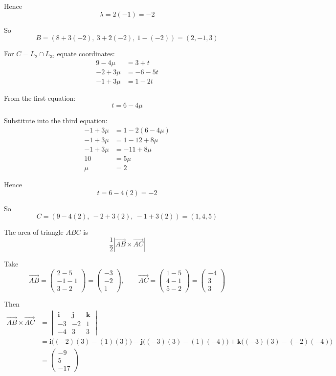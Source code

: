 \documentclass[leqno]{article}
\begin{document}
\begin{enumerate}[
  label=\textbf{\arabic*.},
  leftmargin=*,
  topsep=0pt,
  partopsep=0pt,
  parsep=0pt
]
\begin{djsSolution}
Hence
\[
\lambda=2(-1)=-2
\]

So
\[
B=(8+3(-2),\ 3+2(-2),\ 1-(-2))=(2,-1,3)
\]

For \(C=L_2\cap L_3\), equate coordinates:
\begin{align*}
9-4\mu&=3+t \\
-2+3\mu&=-6-5t \\
-1+3\mu&=1-2t
\end{align*}

From the first equation:
\[
t=6-4\mu
\]

Substitute into the third equation:
\begin{align*}
-1+3\mu&=1-2(6-4\mu) \\
-1+3\mu&=1-12+8\mu \\
-1+3\mu&=-11+8\mu \\
10&=5\mu \\
\mu&=2
\end{align*}

Hence
\[
t=6-4(2)=-2
\]

So
\[
C=(9-4(2),\ -2+3(2),\ -1+3(2))=(1,4,5)
\]

The area of triangle \(ABC\) is
\[
\frac12\left|\overrightarrow{AB}\times\overrightarrow{AC}\right|
\]

Take
\[
\overrightarrow{AB}=
\begin{pmatrix}
2-5\\
-1-1\\
3-2
\end{pmatrix}
=
\begin{pmatrix}
-3\\
-2\\
1
\end{pmatrix},
\qquad
\overrightarrow{AC}=
\begin{pmatrix}
1-5\\
4-1\\
5-2
\end{pmatrix}
=
\begin{pmatrix}
-4\\
3\\
3
\end{pmatrix}
\]

Then
\begin{align*}
\overrightarrow{AB}\times\overrightarrow{AC}
&=
\begin{vmatrix}
\mathbf i & \mathbf j & \mathbf k\\
-3 & -2 & 1\\
-4 & 3 & 3
\end{vmatrix} \\
&=\mathbf i\bigl((-2)(3)-(1)(3)\bigr)-\mathbf j\bigl((-3)(3)-(1)(-4)\bigr)+\mathbf k\bigl((-3)(3)-(-2)(-4)\bigr) \\
&=\begin{pmatrix}-9\\5\\-17\end{pmatrix}
\end{align*}


\end{djsSolution}
\end{enumerate}
\end{document}
